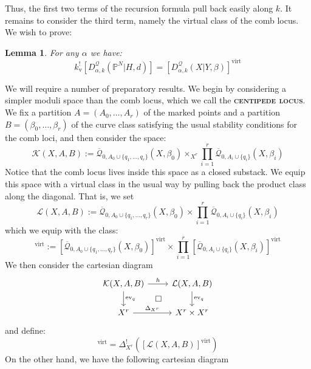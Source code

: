 \documentclass[11pt]{amsart}
\newcommand{\Q}[4]{\overline{\mathcal Q}_{#1,#2}(#3,#4)}
\newcommand{\PP}{\mathbb P}
\newcommand{\virt}[1]{[#1]^{\operatorname{virt}}}
\newcommand{\ev}{\operatorname{ev}}
\newcommand{\ildef}[1]{\textbf{\textsc{#1}}}
\theoremstyle{plain}
\newtheorem{lem}[thm]{Lemma}
\theoremstyle{definition}
\begin{document}
Thus, the first two terms of the recursion formula pull back easily along $k$. It remains to consider the third term, namely the virtual class of the comb locus. We wish to prove:
\begin{lem} \label{Comb loci pull back} For any $\alpha$ we have:
\begin{equation*} k_{\text{v}}^! [D^\mathcal{Q}_{\alpha,k}(\PP^N|H,d)] = \virt{D^\mathcal{Q}_{\alpha,k}(X|Y,\beta)} \end{equation*} \end{lem}
We will require a number of preparatory results. We begin by considering a simpler moduli space than the comb locus, which we call the \ildef{centipede locus}. We fix a partition $A=(A_0,\ldots,A_r)$ of the marked points and a partition $B=(\beta_0, \ldots, \beta_r)$ of the curve class satisfying the usual stability conditions for the comb loci, and then consider the space:
\begin{equation*} \mathcal{K}(X,A,B) := \Q{0}{A_0 \cup \{ q_1, \ldots, q_r \}}{X}{\beta_0} \times_{X^r} \prod_{i=1}^r \Q{0}{A_i\cup\{q_i\}}{X}{\beta_i} \end{equation*}
Notice that the comb locus lives inside this space as a closed substack. We equip this space with a virtual class in the usual way by pulling back the product class along the diagonal. That is, we set
\begin{equation*} \mathcal{L}(X,A,B) :=  \Q{0}{A_0 \cup \{ q_1, \ldots, q_r \}}{X}{\beta_0} \times \prod_{i=1}^r \Q{0}{A_i\cup\{q_i\}}{X}{\beta_i} \end{equation*}
which we equip with the class:
\begin{equation*} \virt{\mathcal{L}(X,A,B)} := \virt{\Q{0}{A_0 \cup \{ q_1, \ldots, q_r \}}{X}{\beta_0}} \times \prod_{i=1}^r \virt{\Q{0}{A_i\cup\{q_i\}}{X}{\beta_i}} \end{equation*}
We then consider the cartesian diagram
\begin{equation} \label{Product diagram}
\begin{tikzcd}
\mathcal{K}(X,A,B) \ar[r,"h"] \ar[d,"\ev_q"] \ar[rd,phantom,"\square"] & \mathcal{L}(X,A,B) \ar[d,"\ev_q"] \\
X^r \ar[r,"\Delta_{X^r}"] & X^r \times X^r
\end{tikzcd}
\end{equation}
and define:
\begin{equation*} \virt{\mathcal{K}(X,A,B)} = \Delta_{X^r}^! (\virt{\mathcal{L}(X,A,B)}) \end{equation*}
On the other hand, we have the following cartesian diagram
\end{document}
